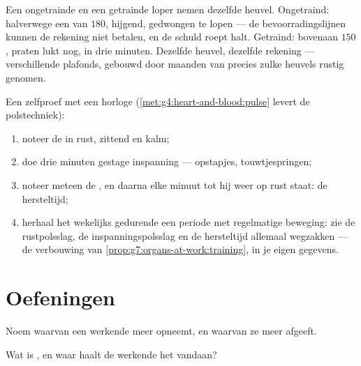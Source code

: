 \begin{example}\label{ex:g7:organs-at-work:runners}
Een ongetrainde en een getrainde loper nemen dezelfde heuvel.
Ongetraind: halverwege een  van $180$, hijgend, gedwongen te
lopen --- de bevoorradingslijnen kunnen de rekening niet betalen, en de
schuld roept halt. Getraind: bovenaan $150$, praten lukt nog,  in
drie minuten. Dezelfde heuvel, dezelfde rekening --- verschillende
plafonds, gebouwd door maanden van precies zulke heuvels rustig genomen.
\end{example}

\begin{method}\label{met:g7:organs-at-work:read}
Een zelfproef met een horloge
(\cref{met:g4:heart-and-blood:pulse} levert de polstechniek):
\begin{enumerate}
  \item noteer de  in rust, zittend en kalm;
  \item doe drie minuten gestage inspanning --- opstapjes, touwtjespringen;
  \item noteer meteen de , en daarna elke minuut tot hij weer op
        rust staat: de hersteltijd;
  \item herhaal het wekelijks gedurende een periode met regelmatige
        beweging: zie de rustpolsslag, de inspanningspolsslag en de
        hersteltijd allemaal wegzakken --- de verbouwing van
        \cref{prop:g7:organs-at-work:training}, in je eigen gegevens.
\end{enumerate}
\end{method}

\section{Oefeningen}

\begin{exercise}[$\star$]\label{exo:g7:organs-at-work:1}
Noem waarvan een werkende  meer opneemt, en waarvan ze meer afgeeft.
\end{exercise}

\begin{exercise}[$\star$]\label{exo:g7:organs-at-work:2}
Wat is , en waar haalt de werkende  het vandaan?
\end{exercise}

